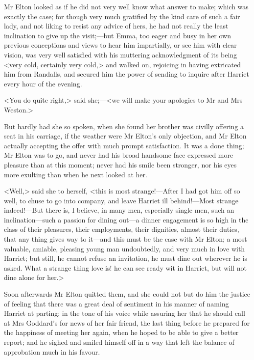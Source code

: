 Mr Elton looked as if he did not very well know what answer to make; which was exactly the case; for though very much gratified by the kind care of such a fair lady, and not liking to resist any advice of hers, he had not really the least inclination to give up the visit;—but Emma, too eager and busy in her own previous conceptions and views to hear him impartially, or see him with clear vision, was very well satisfied with his muttering acknowledgment of its being <very cold, certainly very cold,> and walked on, rejoicing in having extricated him from Randalls, and secured him the power of sending to inquire after Harriet every hour of the evening.

<You do quite right,> said she;—<we will make your apologies to Mr and Mrs Weston.>

But hardly had she so spoken, when she found her brother was civilly offering a seat in his carriage, if the weather were Mr Elton's only objection, and Mr Elton actually accepting the offer with much prompt satisfaction. It was a done thing; Mr Elton was to go, and never had his broad handsome face expressed more pleasure than at this moment; never had his smile been stronger, nor his eyes more exulting than when he next looked at her.

<Well,> said she to herself, <this is most strange!—After I had got him off so well, to chuse to go into company, and leave Harriet ill behind!—Most strange indeed!—But there is, I believe, in many men, especially single men, such an inclination—such a passion for dining out—a dinner engagement is so high in the class of their pleasures, their employments, their dignities, almost their duties, that any thing gives way to it—and this must be the case with Mr Elton; a most valuable, amiable, pleasing young man undoubtedly, and very much in love with Harriet; but still, he cannot refuse an invitation, he must dine out wherever he is asked. What a strange thing love is! he can see ready wit in Harriet, but will not dine alone for her.>

Soon afterwards Mr Elton quitted them, and she could not but do him the justice of feeling that there was a great deal of sentiment in his manner of naming Harriet at parting; in the tone of his voice while assuring her that he should call at Mrs Goddard's for news of her fair friend, the last thing before he prepared for the happiness of meeting her again, when he hoped to be able to give a better report; and he sighed and smiled himself off in a way that left the balance of approbation much in his favour.

